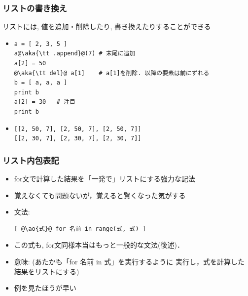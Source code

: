 \documentclass[10pt,dvipdfmx]{beamer}
\newcommand{\ao}[1]{{\color{blue}#1}}
\newcommand{\aka}[1]{{\color{red}#1}}
\begin{document}
\begin{frame}[fragile]
\frametitle{リストの書き換え}
リストには, 値を追加・削除したり, 書き換えたりすることができる
\begin{itemize}
\item 
\begin{lstlisting}
a = [ 2, 3, 5 ]
a@\aka{\tt .append}@(7) # 末尾に追加
a[2] = 50
@\aka{\tt del}@ a[1]    # a[1]を削除. 以降の要素は前にずれる
b = [ a, a, a ]
print b
a[2] = 30   # 注目
print b
\end{lstlisting}
\item 
\begin{lstlisting}
[[2, 50, 7], [2, 50, 7], [2, 50, 7]]
[[2, 30, 7], [2, 30, 7], [2, 30, 7]]
\end{lstlisting}
\end{itemize}
\end{frame}


\begin{frame}[fragile]
\frametitle{リスト内包表記}
\begin{itemize}
\item for文で計算した結果を「一発で」リストにする強力な記法
\item 覚えなくても問題ないが，覚えると賢くなった気がする
\item 文法:
\begin{lstlisting}
[ @\ao{式}@ for 名前 in range(式, 式) ]
\end{lstlisting}
\item この式も, for文同様本当はもっと一般的な文法(後述)．

\item 意味: (あたかも「for 名前 in 式」を実行するように
実行し，\ao{式}を計算した結果をリストにする)

\item 例を見たほうが早い
\end{itemize}
\end{frame}
\end{document}
